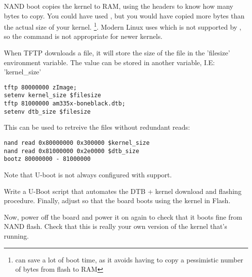 NAND boot  copies the kernel to RAM, using the  headers
to know how many bytes to copy. You could have used , but you would have copied more bytes than
the actual size of your kernel. \footnote{ can save a lot 
of boot time, as it avoids having to copy a pessimistic number of
bytes from flash to RAM}. Modern Linux uses  which is not
supported by , so the command is not appropriate for newer kernels.

When TFTP downloads a file, it will store the size of the file in the 'filesize'
environment variable. The value can be stored in another variable, I.E: 'kernel\_size'

\begin{verbatim}
tftp 80000000 zImage; 
setenv kernel_size $filesize
tftp 81000000 am335x-boneblack.dtb; 
setenv dtb_size $filesize
\end{verbatim}

This can be used to retreive the files without redundant reads:

\begin{verbatim}
nand read 0x80000000 0x300000 $kernel_size
nand read 0x81000000 0x2e0000 $dtb_size
bootz 80000000 - 81000000
\end{verbatim}

Note that U-boot is not always configured
with  support.

Write a U-Boot script that automates the DTB + kernel download
and flashing procedure. Finally, adjust  so that
the board boots using the kernel in Flash.

Now, power off the board and power it on again to check that it boots
fine from NAND flash. Check that this is really your own version of
the kernel that's running.
